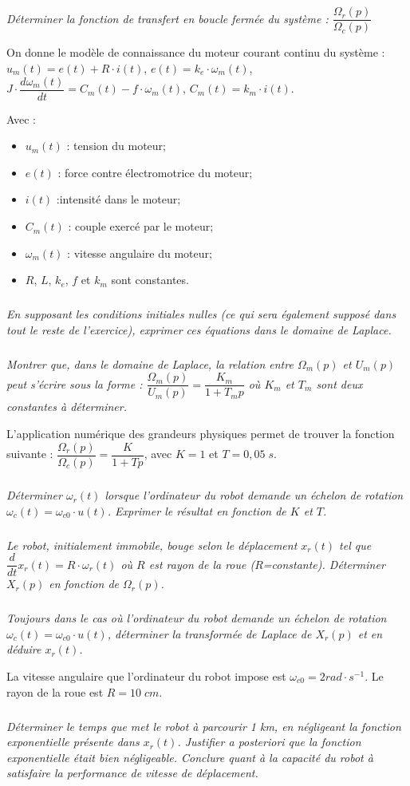 \documentclass[10pt,fleqn]{article} %
\begin{document}
\begin{multicols}{2}
\subparagraph{}
\textit{ Déterminer la fonction de transfert en boucle fermée du système : $\dfrac{\Omega_r(p)}{\Omega_c(p)}$}


On donne le modèle de connaissance du moteur courant continu du système :
$u_m(t) = e(t) + R\cdot i(t)$, $e(t) = k_e\cdot \omega_m(t)$, $J\cdot \dfrac{d\omega_m(t)}{dt} = C_m (t) -f\cdot \omega_m(t)$, $C_m (t) = k_m \cdot i(t)$.


Avec : 
\begin{itemize}
\item $u_m (t)$ : tension du moteur; 
\item $e(t)$ : force contre électromotrice du moteur; 
\item $i(t)$ :intensité dans le moteur;
\item $C_m (t)$ : couple exercé par le moteur;
\item $\omega_m(t)$ : vitesse angulaire du moteur;
\item $R$, $L$, $k_e$, $f$ et $k_m$ sont constantes.
\end{itemize}

\subparagraph{}
\textit{En supposant les conditions initiales nulles (ce qui sera également supposé dans tout le reste de l'exercice), exprimer ces équations dans le domaine de Laplace. }


\subparagraph{}
\textit{Montrer que, dans le domaine de Laplace, la relation entre $\Omega_m (p)$ et $U_m (p)$ peut s'écrire sous la forme : $\dfrac{\Omega_m(p)}{U_m(p)} = \dfrac{K_m}{1+T_mp} $ où $K_m$ et $T_m$ sont deux constantes à déterminer.}

L'application numérique des grandeurs physiques permet de trouver la fonction suivante : 
$\dfrac{\Omega_r(p)}{\Omega_c(p)}=\dfrac{K}{1+Tp}$, avec $K=1$ et $T=0,05\;s$.



\subparagraph{}
\textit{Déterminer $\omega_r (t)$ lorsque l’ordinateur du robot demande un échelon de rotation $\omega_c (t) = \omega_{c0} \cdot u(t)$. Exprimer le résultat en fonction de $K$ et $T$.}



\subparagraph{}
\textit{Le robot, initialement immobile, bouge selon le déplacement $x_r (t)$ tel que $\dfrac{d}{dt} x_r (t) = R\cdot \omega_r (t)$ où $R$ est rayon de la roue ($R$=constante). Déterminer $X_r (p)$ en fonction de $\Omega_r (p)$.}

\subparagraph{}
\textit{Toujours dans le cas où l'ordinateur du robot demande un échelon de rotation $\omega_c (t) = \omega_{c0}\cdot u(t)$, déterminer la transformée de Laplace de $X_r (p)$ et en déduire $x_r (t)$.} 

La vitesse angulaire que l'ordinateur du robot impose est $\omega_{c0}=2 rad\cdot s^{-1}$. Le rayon de la roue est $R=10\;cm$.  

\subparagraph{}
\textit{Déterminer le temps que met le robot à parcourir 1 km, en négligeant la fonction exponentielle présente dans $x_r (t)$. Justifier a posteriori que la fonction exponentielle était bien négligeable. Conclure quant à la capacité du robot à satisfaire la performance de vitesse de déplacement.}

\end{multicols}
\end{document}

